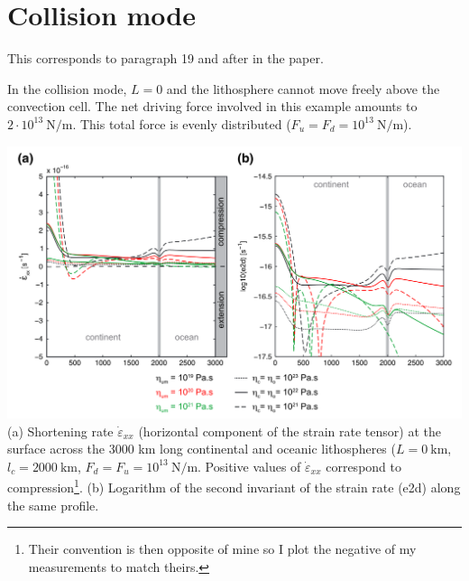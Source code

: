 \newpage
\section*{Collision mode}

This corresponds to paragraph 19 and after in the paper. 

In the collision mode, $L = 0$ and the lithosphere cannot
move freely above the convection cell. The net driving force involved in this
example amounts to $2\cdot 10^{13}~\si{\newton\per\meter}$. This total force is evenly
distributed ($F_u = F_d = 10^{13}~\si{\newton\per\meter}$). 


\begin{center}
\includegraphics[width=14cm]{python_codes/fieldstone_143/images/fig4}\\
{\captionfont (a) Shortening rate  $\dot{\varepsilon}_{xx}$ 
(horizontal component of the strain rate tensor) at the surface across the
3000 km long continental and oceanic lithospheres ($L = 0~\si{\km}$, 
$l_c = 2000~\si{\km}$, $F_d = F_u = 10^{13}~\si{\newton\per\meter}$. 
Positive values of  $\dot{\varepsilon}_{xx}$ correspond to compression\footnote{Their convention
is then opposite of mine so I plot the negative of my measurements to match theirs.}. 
(b) Logarithm of the second invariant of the strain rate (e2d) along the same profile.}
\end{center}

